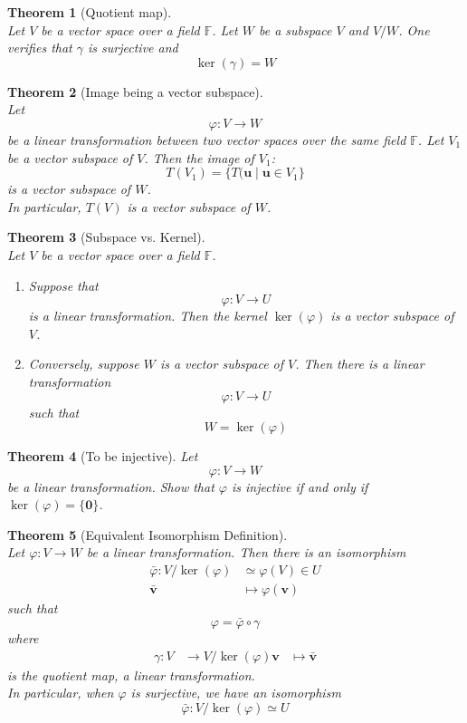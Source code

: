 \documentclass[12pt]{article}
\newtheorem{theorem}{Theorem}[section]
\theoremstyle{definition}
\begin{document}
\begin{theorem}[Quotient map]
\hfill\\\normalfont Let $V$ be a vector space over a field $\mathbb{F}$. Let $W$ be a subspace $V$ and $V/W$. One verifies that $\gamma$ is surjective and
\[
\ker(\gamma)=W
\]
\end{theorem}
\begin{theorem}[Image being a vector subspace]
\hfill\\\normalfont Let 
\[
\varphi:V\to W
\]
be a linear transformation between two vector spaces over the same field $\mathbb{F}$. Let $V_1$ be a vector subspace of $V$. Then the image of $V_1$:
\[
T(V_1)=\{T(\mathbf{u}\mid \mathbf{u}\in V_1\}
\]
is a vector subspace of $W$.\\
In particular, $T(V)$ is a vector subspace of $W$.
\end{theorem}
\begin{theorem}[Subspace vs. Kernel]
\hfill\\\normalfont Let $V$ be a vector space over a field $\mathbb{F}$.
\begin{enumerate}[label=(\arabic*)]
\item Suppose that
\[
\varphi:V\to U
\]
is a linear transformation. Then the \textit{kernel} $\ker(\varphi)$ is a vector subspace of $V$.
\item Conversely, suppose $W$ is a vector subspace of $V$. Then there is a linear transformation
\[
\varphi:V\to U
\]
such that
\[
W=\ker(\varphi)
\]
\end{enumerate}
\end{theorem}
\begin{theorem}[To be injective]
Let
\[
\varphi:V\to W
\]
be a linear transformation. Show that $\varphi$ is injective if and only if $\ker(\varphi)=\{\mathbf{0}\}$.
\end{theorem}
\begin{theorem}[Equivalent Isomorphism Definition]
\hfill\\\normalfont Let $\varphi:V\to W$ be a linear transformation. Then there is an isomorphism
\[
\begin{aligned}
\bar{\varphi}:V/\ker(\varphi)&\simeq \varphi(V)\in U\\
\bar{\mathbf{v}}&\mapsto\varphi(\mathbf{v})
\end{aligned}
\]
such that
\[
\varphi=\bar{\varphi}\circ\gamma
\]
where
\[
\begin{aligned}
\gamma:V&\to V/\ker(\varphi)
\mathbf{v}&\mapsto\bar{\mathbf{v}}
\end{aligned}
\]
is the quotient map, a linear transformation.\\
In particular, when $\varphi$ is surjective, we have an isomorphism
\[
\bar{\varphi}:V/\ker(\varphi)\simeq U
\]
\end{theorem}
\end{document}
